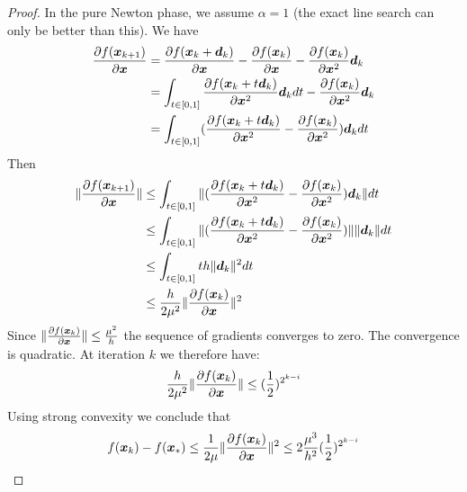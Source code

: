 \begin{proof}
   In the pure Newton phase, we assume $\alpha=1$ (the exact line search can
   only be better than this).
   We have
   \begin{align}
     \partialfrac{\xb}{f(\xb_{k+1})} &= \partialfrac{\xb}{f(\xb_{k} + \db_k)} -\partialfrac{\xb}{f(\xb_k)} -  \partialfrac{\xb^2}{f(\xb_k)} \db_k \\
                                     &= \int_{t \in [0, 1]} \partialfrac{\xb^2}{f(\xb_{k} + t \db_k)} \db_k dt  -  \partialfrac{\xb^2}{f(\xb_k)} \db_k \\
                                     &=\int_{t \in [0, 1]} (\partialfrac{\xb^2}{f(\xb_{k} + t \db_k)} -  \partialfrac{\xb^2}{f(\xb_k)}) \db_k dt  \\
   \end{align}
   Then 
   \begin{align}
     \|\partialfrac{\xb}{f(\xb_{k+1})}\| &\leq \int_{t \in [0, 1]} \|(\partialfrac{\xb^2}{f(\xb_{k} + t \db_k)} -  \partialfrac{\xb^2}{f(\xb_k)}) \db_k\| dt  \\
     &\leq \int_{t \in [0, 1]} \|(\partialfrac{\xb^2}{f(\xb_{k} + t \db_k)} -  \partialfrac{\xb^2}{f(\xb_k)})\| \| \db_k\| dt  \\
                                         &\leq  \int_{t \in [0, 1]} t h\|\db_k\|^2 dt  \\
                                         &\leq  \frac{h}{2 \mu^2}\|\partialfrac{\xb}{f(\xb_{k})}\|^2 \\
   \end{align}
   Since $\|\partialfrac{\xb}{f(\xb_{k})}\| \leq \frac{\mu^2}{h}$ the sequence
   of gradients converges to zero. The convergence is quadratic.
   At iteration $k$ we therefore have:
   \begin{align}
   \frac{h}{2 \mu^2} \|\partialfrac{\xb}{f(\xb_{k})}\|
     &\leq  (\frac12)^{2^{k-i}} \\
   \end{align}
   Using strong convexity we conclude that
   \begin{align}
     f(\xb_k) - f(\xb_*) \leq \frac1{2 \mu} \|\partialfrac{\xb}{f(\xb_{k})}\|^2 \leq  2 \frac{\mu^3}{h^2} (\frac12)^{2^{k-i}}
   \end{align}
 \end{proof}

